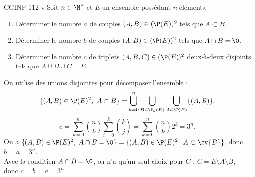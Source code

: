 \documentclass[11pt]{article}
\begin{document}
\begin{exercice}{CCINP 112 $\star$}{}
    Soit $n\in\N^*$ et $E$ un ensemble possédant $n$ éléments.
    \begin{enumerate}
        \item Déterminer le nombre $a$ de couples $(A,B)\in(\P(E))^2$ tels que $A\subset B$.
        \item Déterminer le nombre $b$ de couples $(A,B)\in(\P(E))^2$ tels que $A\cap B=\0$.
        \item Déterminer le nombre $c$ de triplets $(A,B,C)\in(\P(E))^2$ deux-à-deux disjoints tels que $A\cup B\cup C=E$.
    \end{enumerate}
    \tcblower
     On utilise des unions disjointes pour décomposer l'ensemble :
    \begin{equation*}
        \{(A,B)\in\P(E)^2, ~ A \subset B\} = \bigcup_{k=0}^n\bigcup_{B \in \P_k(E)}\bigcup_{A\in \P(B)}\{(A,B)\}.
    \end{equation*}
    \begin{equation*}
        c=\sum_{k=0}^n\binom{n}{k}\sum_{i=0}^k\binom{k}{j} = \sum_{k=0}^n\binom{n}{k}2^k = 3^n.
    \end{equation*} 
     On a $\{(A,B)\in\P(E)^2, ~ A\cap B = \0\}=\{(A,B)\in\P(E)^2, ~ A\subset \ov{B}\}$, donc $b=a=3^n$.\\
     Avec la condition $A\cap B = \0$, on n'a qu'un seul choix pour $C$ : $C=E\setminus A \setminus B$, donc $c=b=a=3^n$.
\end{exercice}

\vspace*{-0.7cm}
\end{document}
